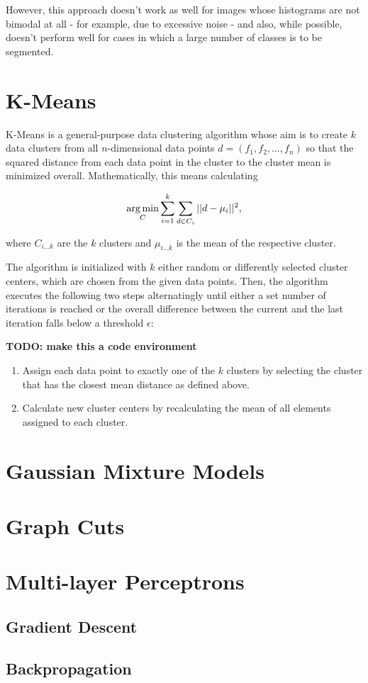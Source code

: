 However, this approach doesn't work as well for images whose histograms are not bimodal at all - for example, due to excessive noise - and also, while possible, doesn't perform well for cases in which a large number of classes is to be segmented. 


	\section{K-Means}
K-Means\cite{kmeans} is a general-purpose data clustering algorithm whose aim is to create $k$ data clusters from all $n$-dimensional data points $d = (f_1, f_2, \dots, f_n)$ so that the squared distance from each data point in the cluster to the cluster mean is minimized overall. Mathematically, this means calculating

\[ \operatorname*{arg\,min} \limits_{C} \sum \limits_{i=1}^{k} \sum \limits_{d \in C_i} || d - \mu_i||^2 ,\]

\noindent where $C_{i \dots k}$ are the $k$ clusters and $\mu_{i \dots k}$ is the mean of the respective cluster.

The algorithm is initialized with $k$ either random or differently selected cluster centers, which are chosen from the given data points. Then, the algorithm executes the following two steps alternatingly until either a set number of iterations is reached or the overall difference between the current and the last iteration falls below a threshold $\epsilon$:

\textbf{TODO: make this a code environment}\\
\begin {enumerate}
	\item Assign each data point to exactly one of the $k$ clusters by selecting the cluster that has the closest mean distance as defined above.
	\item Calculate new cluster centers by recalculating the mean of all elements assigned to each cluster.
\end {enumerate}

	\section{Gaussian Mixture Models}

	\section{Graph Cuts}

	\section{Multi-layer Perceptrons}

		\subsection {Gradient Descent}

		\subsection{Backpropagation}